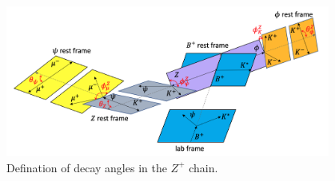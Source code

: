 \begin{figure}[!hbtp]
\centering
\includegraphics[width=0.95\textwidth]{Figures/03_Zcs/05_Likelihood/Cartoon/B2ZPhi.png}%
   \caption{Defination of decay angles in the $Z^{+}$ chain.}
\label{fig:cartoon_chain_ZPhi}
\end{figure}

